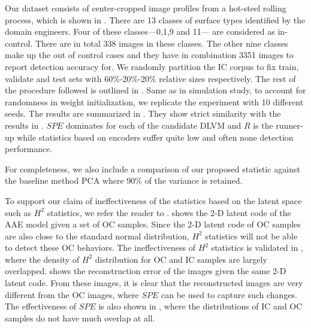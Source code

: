 \documentclass[journal, peerreview]{IEEEtran}
\begin{document}
Our dataset consists of center-cropped image profiles from a hot-steel rolling process, which is shown in . 
There are 13 classes of surface types identified by the domain engineers.
Four of these classes---0,1,9 and 11--- are considered as in-control.
There are in total 338 images in these classes.
The other nine classes make up the out of control cases and they have in combination 3351 images to report detection accuracy for.
We randomly partition the IC corpus to fix train, validate and test sets with 60\%-20\%-20\% relative sizes respectively.
The rest of the procedure followed is outlined in .
Same as in simulation study, to account for randomness in weight initialization, we replicate the experiment with 10 different seeds. 
The results are summarized in .
They show strict similarity with the results in . 
$SPE$ dominates for each of the candidate DLVM and $R$ is the runner-up while statistics based on encoders suffer quite low and often none detection performance.

For completeness, we also include a comparison of our proposed statistic against the baseline method PCA where 90\% of the variance is retained.



To support our claim of ineffectiveness of the statistics based on the latent space such as $H^2$ statistics, we refer the reader to .  shows the 2-D latent code of the AAE model given a set of OC samples. Since the 2-D latent code of OC samples are also close to the standard normal distribution, $H^2$ statistics will not be able to detect these OC behaviors. The ineffectiveness of $H^2$ statistics is validated in , where the density of $H^2$ distribution for OC and IC samples are largely overlapped.  shows the reconstruction error of the images given the same 2-D latent code. From these images, it is clear that the reconstructed images are very different from the OC images, where $SPE$ can be used to capture such changes. The effectiveness of $SPE$ is also shown in , where the distributions of IC and OC samples do not have much overlap at all. 
\end{document}
